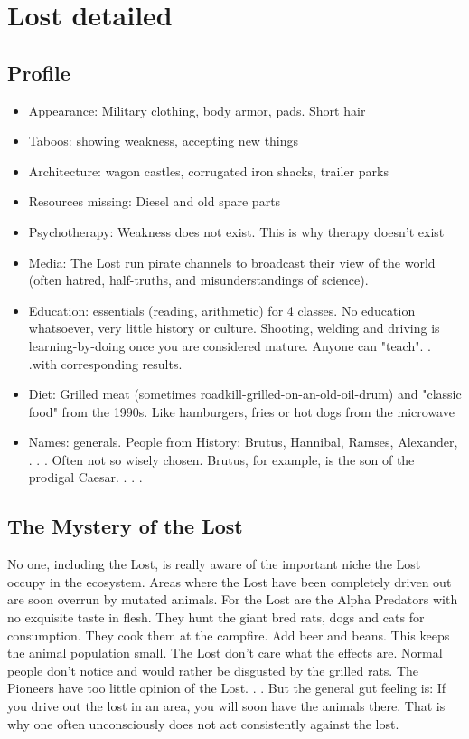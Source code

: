 \chapter {Lost detailed}




\section{Profile}
\begin{itemize}
    \item Appearance: Military clothing, body armor, pads. Short hair
    \item Taboos: showing weakness, accepting new things
    \item Architecture: wagon castles, corrugated iron shacks, trailer parks
    \item Resources missing: Diesel and old spare parts
    \item Psychotherapy: Weakness does not exist. This is why therapy doesn't exist
    \item Media: The Lost run pirate channels to broadcast their view of the world (often hatred, half-truths, and misunderstandings of science).
    \item Education: essentials (reading, arithmetic) for 4 classes. No education whatsoever, very little history or culture. Shooting, welding and driving is learning-by-doing once you are considered mature. Anyone can "teach". . .with corresponding results.
    \item Diet: Grilled meat (sometimes roadkill-grilled-on-an-old-oil-drum) and "classic food" from the 1990s. Like hamburgers, fries or hot dogs from the microwave
    \item Names: generals. People from History: Brutus, Hannibal, Ramses, Alexander, . . . Often not so wisely chosen. Brutus, for example, is the son of the prodigal Caesar. . . .

\end{itemize}



\section{The Mystery of the Lost}
No one, including the Lost, is really aware of the important niche the Lost occupy in the ecosystem. Areas where the Lost have been completely driven out are soon overrun by mutated animals.
For the Lost are the Alpha Predators with no exquisite taste in flesh. They hunt the giant bred rats, dogs and cats for consumption. They cook them at the campfire. Add beer and beans.
This keeps the animal population small. The Lost don't care what the effects are. Normal people don't notice and would rather be disgusted by the grilled rats. The Pioneers have too little opinion of the Lost. . .
But the general gut feeling is: If you drive out the lost in an area, you will soon have the animals there.
That is why one often unconsciously does not act consistently against the lost.
